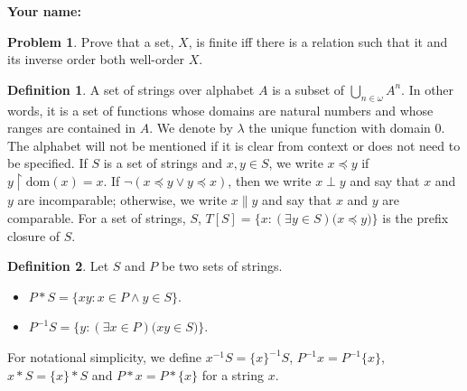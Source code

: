 \documentclass[12pt]{amsart}
\theoremstyle{definition}
\newtheorem{definition}{Definition}
\newtheorem{problem}{Problem}
\newcommand{\dom}[1]{\mathrm{dom}(#1)}
\newcommand{\upto} {{\upharpoonright}}
\begin{document}
\begin{center}
\end{center}


\vspace{1em}

\noindent \textbf{Your name:}\\


\noindent\hrulefill

\vspace{-1.5em}

\noindent\hrulefill

\vspace{1em}




\begin{problem}
Prove that a set, $X$, is finite iff there is a relation such that it and its inverse order both well-order $X$.
\end{problem}





\begin{definition}
A set of strings over alphabet $A$ is a subset of $\bigcup_{n \in \omega} A^n$.  In other words, it is a set of functions whose domains are natural numbers and whose ranges are contained in $A$.  We denote by $\lambda$ the unique function with domain $0$.  The alphabet will not be mentioned if it is clear from context or does not need to be specified.  If $S$ is a set of strings and $x,y \in S$, we write $x \preceq y$ if $y \upto \dom{x} = x$.  If $\lnot ( x \preceq y \vee y \preceq x)$, then we write $x \perp y$ and say that $x$ and $y$ are incomparable; otherwise, we write $x \parallel y$ and say that $x$ and $y$ are comparable.  For a set of strings, $S$, $T[S] = \{ x : (\exists y\in S)\big( x \preceq y \big) \}$ is the prefix closure of $S$.
\end{definition}

\begin{definition}\label{*-1-def} Let $S$ and $P$ be two sets of strings. 
\begin{itemize}
\item $P * S = \{x y : x\in P \wedge y\in S\}$.
\item $P^{-1}S = \{ y : (\exists x\in P)\big( x y \in S \big)  \}$.
\end{itemize}
For notational simplicity, we define $x^{-1}S = \{x\}^{-1}S$, $P^{-1}x = P^{-1}\{x\}$, $x*S = \{x\}*S$ and $P*x = P*\{x\}$ for a string $x$.
\end{definition}
\end{document}
